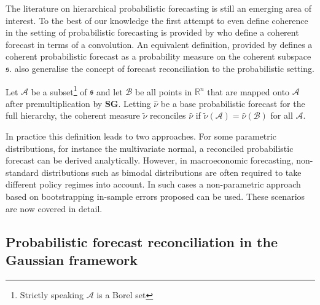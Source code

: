 \documentclass[graybox]{svmult}
\begin{document}
The literature on hierarchical probabilistic forecasting is still an emerging area of interest. %
To the best of our knowledge the first attempt to even define coherence in the setting of probabilistic forecasting is provided by \cite{Taieb2017} who define a coherent forecast in terms of a convolution.  An equivalent definition, provided by \cite{GamEtAl2018} defines a  coherent probabilistic forecast as a probability measure on the coherent subspace $\mathfrak{s}$.  \cite{GamEtAl2018} also generalise the concept of forecast reconciliation to the probabilistic setting.

\begin{definition} Let $\mathcal{A}$ be a subset\footnote{Strictly speaking $\mathcal{A}$ is a Borel set} of $\mathfrak{s}$ and let $\mathcal{B}$ be all points in $\mathbb{R}^n$ that are mapped onto  $\mathcal{A}$ after premultiplication by $\bm{S}\bm{G}$. Letting $\hat{\nu}$ be a base probabilistic forecast for the full hierarchy, the coherent measure $\tilde{\nu}$ reconciles $\hat{\nu}$ if $\tilde{\nu}(\mathcal{A})=\hat{\nu}(\mathcal{B})$ for all $\mathcal{A}$.
\end{definition}

In practice this definition leads to two approaches.  For some parametric distributions, for instance the multivariate normal,  a reconciled probabilistic forecast can be derived analytically.  However, in macroeconomic forecasting, non-standard distributions such as bimodal distributions are often required to take different policy regimes into account.  In such cases a non-parametric approach based on bootstrapping in-sample errors proposed \cite{GamEtAl2018} can be used.  These scenarios are now covered in detail.

\subsection{Probabilistic forecast reconciliation in the Gaussian framework}\label{sec:probrecgauss}

\end{document}
